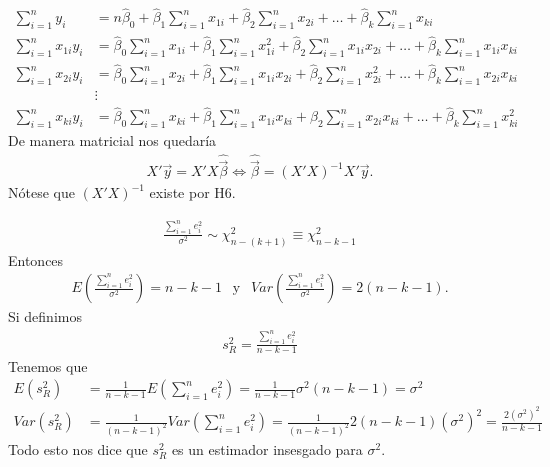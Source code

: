 \begin{align*}
    \sum_{i=1}^{n} y_i        & = n \widehat{\beta}_0 + \widehat{\beta}_1 \sum_{i=1}^{n} x_{1i} + \widehat{\beta}_2 \sum_{i=1}^{n} x_{2i} + \ldots + \widehat{\beta}_k \sum_{i=1}^{n} x_{ki}                                     \\
    \sum_{i=1}^{n} x_{1i} y_i & = \widehat{\beta}_0 \sum_{i=1}^{n} x_{1i} + \widehat{\beta}_1 \sum_{i=1}^{n} x_{1i}^2 + \widehat{\beta}_2 \sum_{i=1}^{n} x_{1i} x_{2i} + \ldots + \widehat{\beta}_k \sum_{i=1}^{n} x_{1i} x_{ki} \\
    \sum_{i=1}^{n} x_{2i} y_i & = \widehat{\beta}_0 \sum_{i=1}^{n} x_{2i} + \widehat{\beta}_1 \sum_{i=1}^{n} x_{1i} x_{2i} + \widehat{\beta}_2 \sum_{i=1}^{n} x_{2i}^2 + \ldots + \widehat{\beta}_k \sum_{i=1}^{n} x_{2i} x_{ki} \\
                              & \vdots                                                                                                                                                                                           \\
    \sum_{i=1}^{n} x_{ki} y_i & = \widehat{\beta}_0 \sum_{i=1}^{n} x_{ki} + \widehat{\beta}_1 \sum_{i=1}^{n} x_{1i} x_{ki} + \widehat{\beta}_2 \sum_{i=1}^{n} x_{2i} x_{ki} + \ldots + \widehat{\beta}_k \sum_{i=1}^{n} x_{ki}^2
\end{align*}
De manera matricial nos quedaría
\begin{align*}
    X'\vec{y} = X'X\widehat{\vec{\beta}} \Longleftrightarrow \widehat{\vec{\beta}} = (X'X)^{-1}X'\vec{y}.
\end{align*}
Nótese que $(X'X)^{-1}$ existe por H6.

\begin{obs}
    \begin{align*}
        \frac{\sum_{i=1}^{n} e_i^2}{\sigma^2} \sim \chi^2_{n-(k+1)} \equiv \chi^2_{n-k-1}
    \end{align*}
    Entonces
    \begin{align*}
        E\left( \frac{\sum_{i=1}^{n} e_i^2}{\sigma^2}  \right) = n-k-1 \ \ \text{ y } \ \ Var\left( \frac{\sum_{i=1}^{n} e_i^2}{\sigma^2} \right) = 2(n-k-1).
    \end{align*}
    Si definimos
    \begin{align*}
        \boxed{
            s_R^2 = \frac{\sum_{i=1}^{n} e_i^2}{n-k-1}
        }
    \end{align*}
    Tenemos que
    \begin{align*}
        E(s_R^2)   & = \frac{1}{n-k-1}E\left( \sum_{i=1}^{n} e_i^2 \right) = \frac{1}{n-k-1} \sigma^2(n-k-1) = \sigma^2                                    \\
        Var(s_R^2) & = \frac{1}{(n-k-1)^2}Var\left( \sum_{i=1}^{n} e_i^2 \right) = \frac{1}{(n-k-1)^2} 2(n-k-1) (\sigma^2)^2 = \frac{2(\sigma^2)^2}{n-k-1}
    \end{align*}
    Todo esto nos dice que $s_R^2$ es un estimador insesgado para $\sigma^2$.
\end{obs}

